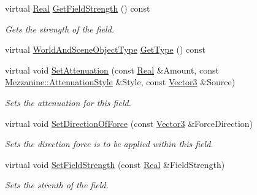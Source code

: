 \begin{DoxyCompactItemize}
virtual \hyperlink{namespaceMezzanine_a726731b1a7df72bf3583e4a97282c6f6}{Real} \hyperlink{classMezzanine_1_1FieldOfForce_ae8071fe3ad4397b57cff5f3816d72e02}{GetFieldStrength} () const 
\begin{DoxyCompactList}\small\item\em Gets the strength of the field. \item\end{DoxyCompactList}\item 
virtual \hyperlink{namespaceMezzanine_ae8cd04f706f4998be62f454b7119c718}{WorldAndSceneObjectType} \hyperlink{classMezzanine_1_1FieldOfForce_ad6247ff9543681daa74a9297c1c7653e}{GetType} () const 
\item 
virtual void \hyperlink{classMezzanine_1_1FieldOfForce_aa2ba435821f4abc4c59b0ca99f077759}{SetAttenuation} (const \hyperlink{namespaceMezzanine_a726731b1a7df72bf3583e4a97282c6f6}{Real} \&Amount, const \hyperlink{namespaceMezzanine_a2d10a79e11a2031df10af540eede12fa}{Mezzanine::AttenuationStyle} \&Style, const \hyperlink{classMezzanine_1_1Vector3}{Vector3} \&Source)
\begin{DoxyCompactList}\small\item\em Sets the attenuation for this field. \item\end{DoxyCompactList}\item 
virtual void \hyperlink{classMezzanine_1_1FieldOfForce_aaa4df06c275221b2b7c313a7d45ec71a}{SetDirectionOfForce} (const \hyperlink{classMezzanine_1_1Vector3}{Vector3} \&ForceDirection)
\begin{DoxyCompactList}\small\item\em Sets the direction force is to be applied within this field. \item\end{DoxyCompactList}\item 
virtual void \hyperlink{classMezzanine_1_1FieldOfForce_abef745957f95ac58f756d84f00fbf549}{SetFieldStrength} (const \hyperlink{namespaceMezzanine_a726731b1a7df72bf3583e4a97282c6f6}{Real} \&FieldStrength)
\begin{DoxyCompactList}\small\item\em Sets the strenth of the field. \item\end{DoxyCompactList}\end{DoxyCompactItemize}

